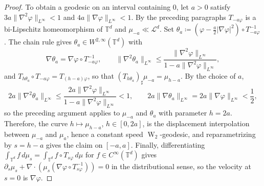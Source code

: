 \documentclass[11pt]{article}
\numberwithin{equation}{section}
\theoremstyle{definition}
\newcommand{\T}{\mathbb{T}}
\newcommand{\Wtwo}{\operatorname{W}_2}
\begin{document}
\begin{proof}
    To obtain a geodesic on an interval containing $0$, let $a > 0$ satisfy $3 a \|\nabla^2\varphi\|_{L^\infty} < 1$ and $4a \|\nabla\varphi\|_{L^\infty} < 1$.
    By the preceding paragraphs $T_{-a\varphi}$ is a bi-Lipschitz homeomorphism of $\T^d$ and $\mu_{-a} \ll \mathcal{L}^d$.
    Set $\theta_a \coloneqq (\varphi - \frac{a}{2}|\nabla\varphi|^2)\circ T_{-a\varphi}^{-1}$.
    The chain rule gives $\theta_a \in W^{2,\infty}(\T^d)$ with
    \[
    \nabla\theta_a = \nabla\varphi \circ T_{-a\varphi}^{-1}, \qquad \|\nabla^2\theta_a\|_{L^\infty} \le \frac{\|\nabla^2\varphi\|_{L^\infty}}{1 - a\|\nabla^2\varphi\|_{L^\infty}},
    \]
    and $T_{h\theta_a} \circ T_{-a\varphi} = T_{(h-a)\varphi}$, so that $(T_{h\theta_a})_\sharp\mu_{-a} = \mu_{h-a}$.
    By the choice of $a$,
    \[
    2a \|\nabla^2\theta_a\|_{L^\infty} \le \frac{2a\|\nabla^2\varphi\|_{L^\infty}}{1 - a\|\nabla^2\varphi\|_{L^\infty}} < 1, \qquad 2a\|\nabla\theta_a\|_{L^\infty} = 2a\|\nabla\varphi\|_{L^\infty} < \frac{1}{2},
    \]
    so the preceding argument applies to $\mu_{-a}$ and $\theta_a$ with parameter $h = 2a$.
    Therefore, the curve $h \mapsto \mu_{h-a}$, $h \in [0,2a]$, is the displacement interpolation between $\mu_{-a}$ and $\mu_a$, hence a constant speed $\Wtwo$-geodesic, and reparametrizing by $s = h-a$ gives the claim on $[-a,a]$.
    Finally, differentiating $\int_{\T^d} f \, d\mu_s = \int_{\T^d} f \circ T_{s\varphi} \, d\mu$ for $f \in C^\infty(\T^d)$ gives $\partial_s \mu_s + \nabla \cdot (\mu_s(\nabla \varphi \circ T_{s\varphi}^{-1})) = 0$ in the distributional sense, so the velocity at $s = 0$ is $\nabla\varphi$.
\end{proof}
\end{document}
